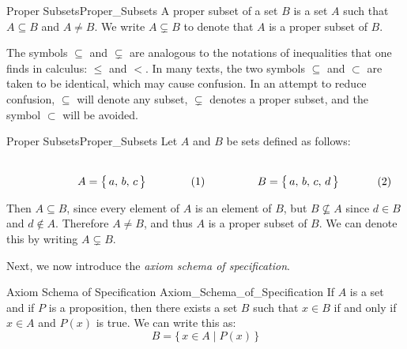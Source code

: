         \begin{fdefinition}{Proper Subsets}{Proper_Subsets}
            A \gls{proper subset} of a \gls{set} $B$ is a set $A$ such that
            $A\subseteq{B}$ and $A\ne{B}$. We write $A\subsetneq{B}$
            to denote that $A$ is a proper subset of $B$.
        \end{fdefinition}
        The symbols $\subseteq$ and $\subsetneq$ are analogous to the notations
        of inequalities that one finds in calculus: $\leq$ and $<$. In many
        texts, the two symbols $\subseteq$ and $\subset$ are taken to be
        identical, which may cause confusion. In an attempt to reduce confusion,
        $\subseteq$ will denote any subset, $\subsetneq$ denotes a proper
        subset, and the symbol $\subset$ will be avoided.
        \begin{fexample}{Proper Subsets}{Proper_Subsets}
            Let $A$ and $B$ be sets defined as follows:
            \par
            \begin{subequations}
                \begin{minipage}[b]{0.49\textwidth}
                    \centering
                    \begin{equation}
                        A=\big\{\,a,\,b,\,c\,\big\}
                    \end{equation}
                \end{minipage}
                \hfill
                \begin{minipage}[b]{0.49\textwidth}
                    \centering
                    \begin{equation}
                        B=\big\{\,a,\,b,\,c,\,d\,\big\}
                    \end{equation}
                \end{minipage}
            \end{subequations}
            \par\vspace{2.5ex}
            Then $A\subseteq{B}$, since every element of $A$ is an element of
            $B$, but $B\nsubseteq{A}$ since $d\in{B}$ and $d\notin{A}$.
            Therefore $A\ne{B}$, and thus $A$ is a proper subset of $B$. We can
            denote this by writing $A\subsetneq{B}$.
        \end{fexample}
        Next, we now introduce the \textit{axiom schema of specification}.
        \begin{faxiom}{Axiom Schema of Specification}
                      {Axiom_Schema_of_Specification}
            If $A$ is a set and if $P$ is a proposition, then there exists a set
            $B$ such that $x\in{B}$ if and only if $x\in{A}$ and $P(x)$ is true.
            We can write this as:
            \begin{equation*}
                B=\big\{\,x\in{A}\;|\;P(x)\,\big\}
            \end{equation*}
        \end{faxiom}
